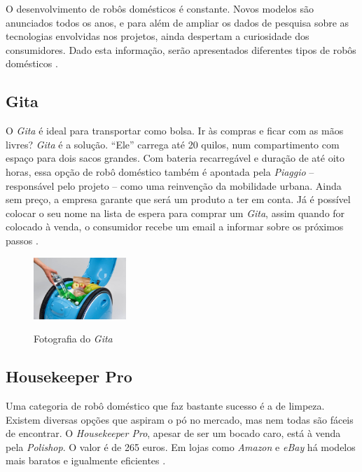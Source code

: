 \documentclass[10pt]{article}
\begin{document}
\hspace{\parindent}O desenvolvimento de robôs domésticos é constante. Novos modelos são anunciados todos os anos, e para além de ampliar os dados de pesquisa sobre as tecnologias envolvidas nos projetos, ainda despertam a curiosidade dos consumidores. Dado esta informação, serão apresentados diferentes tipos de robôs domésticos \cite{examples}.

\subsection{Gita}

\hspace{\parindent}O \textit{Gita} é ideal para transportar como bolsa. Ir às compras e ficar com as mãos livres? \textit{Gita} é a solução. “Ele” carrega até 20 quilos, num compartimento com espaço para dois sacos grandes. Com bateria recarregável e duração de até oito horas, essa opção de robô doméstico também é apontada pela \textit{Piaggio} – responsável pelo projeto – como uma reinvenção da mobilidade urbana. Ainda sem preço, a empresa garante que será um produto a ter em conta. Já é possível colocar o seu nome na lista de espera para comprar um \textit{Gita}, assim quando for colocado à venda, o consumidor recebe um email a informar sobre os próximos passos \cite{examples}.

\begin{figure}[h]
\caption{Fotografia do \textit{Gita}}
\centering
\includegraphics[width = 3.5cm]{img/7.1.jpg}
\label{figura:7.1}
\end{figure}

\subsection{Housekeeper Pro}

\hspace{\parindent}Uma categoria de robô doméstico que faz bastante sucesso é a de limpeza. Existem diversas opções que aspiram o pó no mercado, mas nem todas são fáceis de encontrar. O \textit{Housekeeper Pro}, apesar de ser um bocado caro, está à venda pela \textit{Polishop}. O valor é de 265 euros. Em lojas como \textit{Amazon} e \textit{eBay} há modelos mais baratos e igualmente eficientes \cite{examples}.
\end{document}
